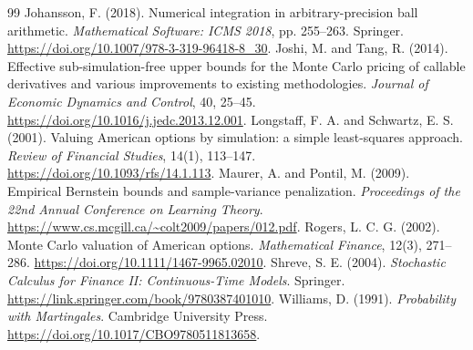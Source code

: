 \documentclass[11pt]{article}
\begin{document}
\begin{thebibliography}{99}
 Johansson, F. (2018). Numerical integration in arbitrary-precision ball arithmetic. \emph{Mathematical Software: ICMS 2018}, pp. 255--263. Springer. \url{https://doi.org/10.1007/978-3-319-96418-8_30}.
 Joshi, M. and Tang, R. (2014). Effective sub-simulation-free upper bounds for the Monte Carlo pricing of callable derivatives and various improvements to existing methodologies. \emph{Journal of Economic Dynamics and Control}, 40, 25--45. \url{https://doi.org/10.1016/j.jedc.2013.12.001}.
 Longstaff, F. A. and Schwartz, E. S. (2001). Valuing American options by simulation: a simple least-squares approach. \emph{Review of Financial Studies}, 14(1), 113--147. \url{https://doi.org/10.1093/rfs/14.1.113}.
 Maurer, A. and Pontil, M. (2009). Empirical Bernstein bounds and sample-variance penalization. \emph{Proceedings of the 22nd Annual Conference on Learning Theory}. \url{https://www.cs.mcgill.ca/~colt2009/papers/012.pdf}.
 Rogers, L. C. G. (2002). Monte Carlo valuation of American options. \emph{Mathematical Finance}, 12(3), 271--286. \url{https://doi.org/10.1111/1467-9965.02010}.
 Shreve, S. E. (2004). \emph{Stochastic Calculus for Finance II: Continuous-Time Models}. Springer. \url{https://link.springer.com/book/9780387401010}.
 Williams, D. (1991). \emph{Probability with Martingales}. Cambridge University Press. \url{https://doi.org/10.1017/CBO9780511813658}.
\end{thebibliography}
\end{document}
